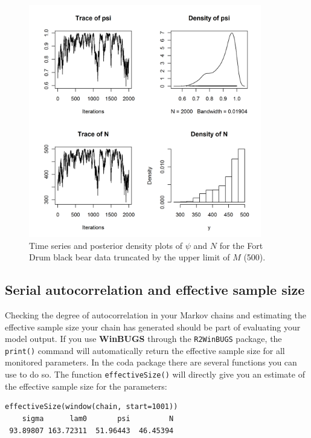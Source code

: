 \begin{figure}[ht]
\begin{center}
\includegraphics[height=4in]{Ch17-MCMC/figs/timeseries2}
\end{center}
\caption{Time series and posterior density plots of $\psi$ and $N$ for the Fort Drum black bear data truncated by the upper limit of $M$ (500).}
\label{mcmc.fig.timeseries2}
\end{figure}

\subsection{Serial autocorrelation and effective sample size}

Checking the degree of autocorrelation in your Markov chains and
estimating the effective sample size your chain has generated should
be part of evaluating your model output. If you use {\bf WinBUGS}
 through the \mbox{\tt R2WinBUGS} package, the \verb#print()# command
 will automatically return the effective sample size for all monitored
 parameters. In the coda package there are several functions you can use
 to do so. The function \verb#effectiveSize()# will directly give you an estimate
 of the effective sample size for the parameters:
\begin{verbatim}
effectiveSize(window(chain, start=1001))
    sigma      lam0       psi         N
 93.89807 163.72311  51.96443  46.45394
\end{verbatim}

